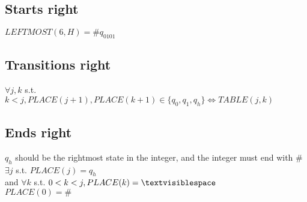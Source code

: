 \documentclass[letterpaper,notitlepage,twoside]{article}
\renewcommand{\iff}{\Leftrightarrow} %
\begin{document}
\subsection*{Starts right}
$LEFTMOST(6, H) = \#q_0101$

\subsection*{Transitions right}
$\forall j, k$ s.t. $k < j, PLACE(j+1), PLACE(k+1) \in \{q_0, q_1, q_h\} \iff TABLE(j, k)$

\subsection*{Ends right}
$q_h$ should be the rightmost state in the integer, and the integer must end with $\#$ \\
$\exists j$ s.t. $PLACE(j) = q_h$ \\
and $\forall k$ s.t. $0 < k < j, PLACE(k) = \textvisiblespace$ \\

$PLACE(0) = \#$
\end{document}
